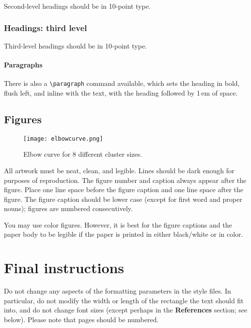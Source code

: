 \documentclass{article}
\begin{document}
Second-level headings should be in 10-point type.

\subsubsection{Headings: third level}

Third-level headings should be in 10-point type.

\paragraph{Paragraphs}

There is also a \verb+\paragraph+ command available, which sets the heading in
bold, flush left, and inline with the text, with the heading followed by 1\,em
of space.

\subsection{Figures}

\begin{figure}
  \centering
  \texttt{[image: elbowcurve.png]}
  \caption{Elbow curve for 8 different cluster sizes.}
\end{figure}

All artwork must be neat, clean, and legible. Lines should be dark enough for
purposes of reproduction. The figure number and caption always appear after the
figure. Place one line space before the figure caption and one line space after
the figure. The figure caption should be lower case (except for first word and
proper nouns); figures are numbered consecutively.

You may use color figures.  However, it is best for the figure captions and the
paper body to be legible if the paper is printed in either black/white or in
color.


\section{Final instructions}

Do not change any aspects of the formatting parameters in the style files.  In
particular, do not modify the width or length of the rectangle the text should
fit into, and do not change font sizes (except perhaps in the
\textbf{References} section; see below). Please note that pages should be
numbered.
\end{document}
